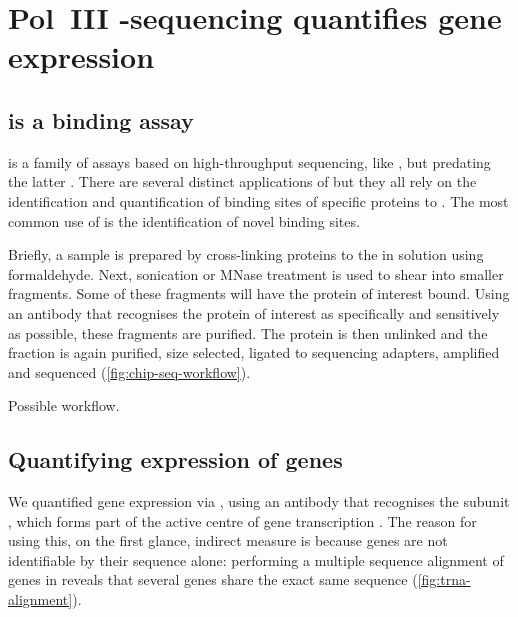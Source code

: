 \section{Pol~III -sequencing quantifies  gene expression}
\label{sec:chip}

\subsection{ is a  binding assay}

\chipseq is a family of assays based on high-throughput sequencing, like
\rnaseq, but predating the latter \citet{Johnson:2007}. There are several
distinct applications of \chipseq but they all rely on the identification and
quantification of binding sites of specific proteins to \dna. The most common
use of \chipseq is the identification of novel \tf binding
sites.

Briefly, a sample is prepared by cross-linking proteins to the \dna in solution
using formaldehyde. Next, sonication or MNase treatment is used to shear \dna
into smaller fragments. Some of these fragments will have the protein of
interest bound. Using an antibody that recognises the protein of interest as
specifically and sensitively as possible, these fragments are purified. The
protein is then unlinked and the \dna fraction is again purified, size selected,
ligated to sequencing adapters, amplified and sequenced
(\cref{fig:chip-seq-workflow}).\todo[ref]{}

    {Possible \chipseq workflow.}
    {}

\subsection{Quantifying expression of  genes}

We quantified \trna gene expression via  \chipseq, using an antibody that
recognises the  subunit , which forms part of the active
centre of \trna gene transcription \citep{Ablasser:2009}. The reason for using
this, on the first glance, indirect measure is because \trna genes are not
identifiable by their sequence alone: performing a multiple sequence alignment
of \trna genes in \mmu reveals that several \trna genes share the exact same
sequence (\cref{fig:trna-alignment}).

